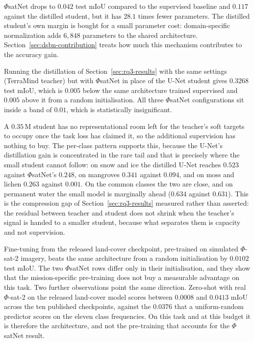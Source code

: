 $\Phi$satNet drops to $0.042$ test mIoU compared to the supervised baseline and $0.117$ against the distilled student, but it has $28.1$ times fewer parameters.
The distilled student's own margin is bought for a small parameter cost: domain-specific normalization adds $6{,}848$ parameters to the shared architecture.
Section~\ref{sec:dsbn-contribution} treats how much this mechanism contributes to the accuracy gain.

Running the distillation of Section~\ref{sec:rq3-results} with the same settings (TerraMind teacher) but with $\Phi$satNet in place of the U-Net student gives $0.3268$ test mIoU, which is $0.005$ below the same architecture trained supervised and $0.005$ above it from a random initialisation.
All three $\Phi$satNet configurations sit inside a band of $0.01$, which is statistically insignificant.

A $0.35$\,M student has no representational room left for the teacher's soft targets to occupy once the task loss has claimed it, so the additional supervision has nothing to buy.
The per-class pattern supports this, because the U-Net's distillation gain is concentrated in the rare tail and that is precisely where the small student cannot follow: on snow and ice the distilled U-Net reaches $0.523$ against $\Phi$satNet's $0.248$, on mangroves $0.341$ against $0.094$, and on moss and lichen $0.263$ against $0.001$.
On the common classes the two are close, and on permanent water the small model is marginally ahead ($0.634$ against $0.631$).
This is the compression gap of Section~\ref{sec:rq3-results} measured rather than asserted: the residual between teacher and student does not shrink when the teacher's signal is handed to a smaller student, because what separates them is capacity and not supervision.

Fine-tuning from the released land-cover checkpoint, pre-trained on simulated $\Phi$-sat-2 imagery, beats the same architecture from a random initialisation by $0.0102$ test mIoU.
The two $\Phi$satNet rows differ only in their initialisation, and they show that the mission-specific pre-training does not buy a measurable advantage on this task.
Two further observations point the same direction.
Zero-shot with real $\Phi$-sat-2 on the released land-cover model scores between $0.0008$ and $0.0413$ mIoU across the ten published checkpoints, against the $0.0376$ that a uniform-random predictor scores on the eleven class frequencies.
On this task and at this budget it is therefore the architecture, and not the pre-training that accounts for the $\Phi$satNet result.

